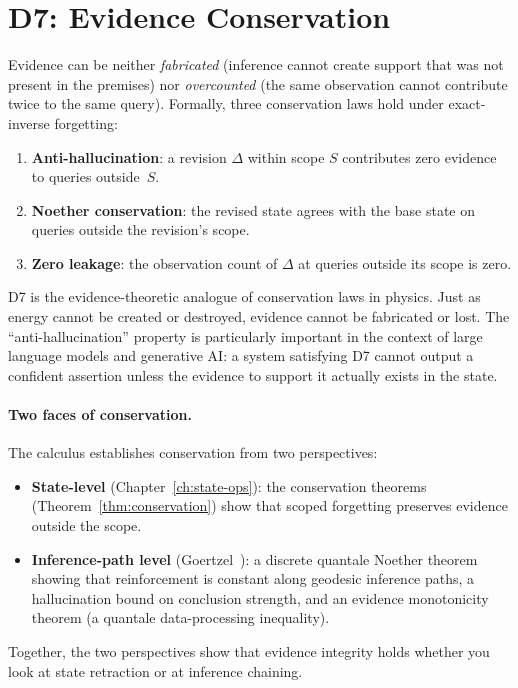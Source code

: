 \section{D7: Evidence Conservation}
\label{sec:d7}

\begin{definition}
\label{def:d7}
Evidence can be neither \emph{fabricated} (inference cannot create
support that was not present in the premises) nor \emph{overcounted}
(the same observation cannot contribute twice to the same query).
Formally, three conservation laws hold under exact-inverse forgetting:
\begin{enumerate}
\item \textbf{Anti-hallucination}: a revision $\Delta$ within scope
  $S$ contributes zero evidence to queries outside~$S$.
\item \textbf{Noether conservation}: the revised state agrees with the
  base state on queries outside the revision's scope.
\item \textbf{Zero leakage}: the observation count of $\Delta$ at
  queries outside its scope is zero.
\end{enumerate}
\end{definition}

\noindent
D7 is the evidence-theoretic analogue of conservation laws in physics.
Just as energy cannot be created or destroyed, evidence cannot be
fabricated or lost.  The ``anti-hallucination'' property is
particularly important in the context of large language models and
generative AI: a system satisfying D7 cannot output a confident
assertion unless the evidence to support it actually exists in the
state.

\paragraph{Two faces of conservation.}
The calculus establishes conservation from two perspectives:
\begin{itemize}
\item \textbf{State-level} (Chapter~\ref{ch:state-ops}): the
  conservation theorems (Theorem~\ref{thm:conservation}) show that
  scoped forgetting preserves evidence outside the scope.
\item \textbf{Inference-path level}
  (Goertzel~\cite{GoertzelEvidenceConservation2026}): a discrete
  quantale Noether theorem showing that reinforcement is constant
  along geodesic inference paths, a hallucination bound on conclusion
  strength, and an evidence monotonicity theorem (a quantale
  data-processing inequality).
\end{itemize}
Together, the two perspectives show that evidence integrity holds
whether you look at state retraction or at inference chaining.

